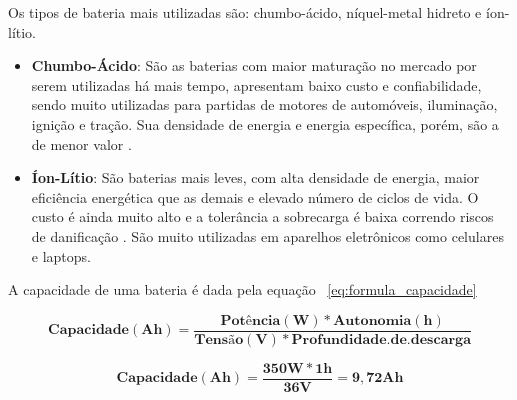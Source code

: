 	Os tipos de bateria mais utilizadas são: chumbo-ácido, níquel-metal hidreto e íon-lítio.
	
	\begin{itemize}
		\item \textbf{Chumbo-Ácido}: São as baterias com maior maturação no mercado por serem utilizadas há mais tempo, apresentam baixo custo e confiabilidade, sendo muito utilizadas para partidas de motores de automóveis, iluminação, ignição e tração. Sua densidade de energia e energia específica, porém, são a de menor valor \cite{bezerra}.
	\item \textbf{Íon-Lítio}:  São baterias mais leves, com alta densidade de energia, maior eficiência energética que as demais e elevado número de ciclos de vida. O custo é ainda muito alto e a tolerância a sobrecarga é baixa correndo riscos de danificação \cite{bezerra}. São muito utilizadas em aparelhos eletrônicos como celulares e laptops.
	\end{itemize}
	
	A capacidade de uma bateria é dada pela equação ~\ref{eq:formula_capacidade}
	
	\begin{equation}
	\label{eq:formula_capacidade}
	\mathbf{Capacidade(Ah) = \frac{Potência(W) * Autonomia(h)}{Tensão(V) * Profundidade. de. descarga}}
	\end{equation}
	
	\begin{equation}
	\label{eq:calculo_bateria}
	\mathbf{Capacidade(Ah) = \frac{350W * 1h}{36V} = 9,72Ah}
	\end{equation}
	
	

	

	
